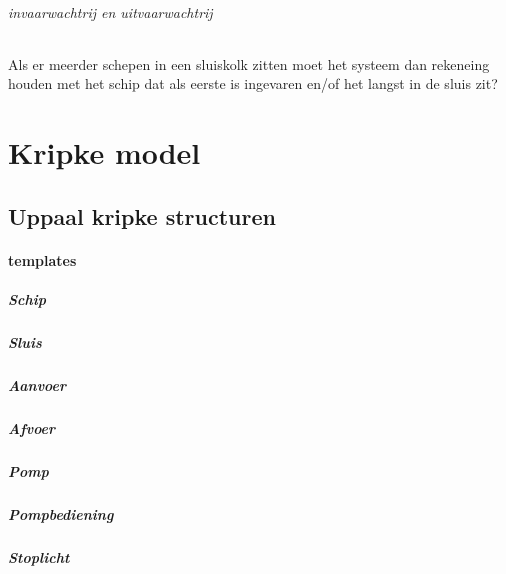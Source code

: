 \subparagraph{invaarwachtrij en uitvaarwachtrij}
Als er meerder schepen in een sluiskolk zitten moet het systeem dan rekeneing houden met het schip dat als eerste is ingevaren en/of het langst in de sluis zit?





\chapter{Kripke model}

\section{Uppaal kripke structuren}


\subsubsection{templates}

\paragraph{Schip}

\paragraph{Sluis}


\paragraph{Aanvoer}


\paragraph{Afvoer}

\paragraph{Pomp}

\paragraph{Pompbediening}


\paragraph{Stoplicht}

